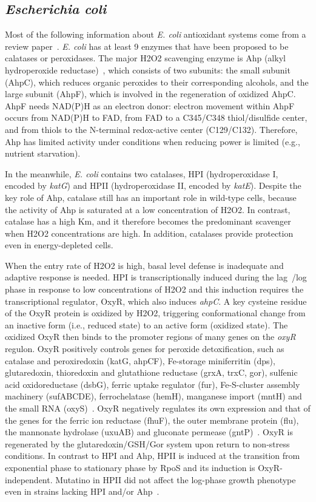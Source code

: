 \documentclass[11pt]{article}
\begin{document}
\subsection{\textit{Escherichia coli}}

Most of the following information about \textit{E. coli} antioxidant systems come from a review paper~\cite{mishra2012bacteria}. \textit{E. coli} has at least 9 enzymes that have been proposed to be calatases or peroxidases. The major H2O2 scavenging enzyme is Ahp (alkyl hydroperoxide reductase)~\cite{seaver2001alkyl}, which consists of two subunits: the small subunit (AhpC), which reduces organic peroxides to their corresponding alcohols, and the large subunit (AhpF), which is involved in the regeneration of oxidized AhpC. AhpF needs NAD(P)H as an electron donor: electron movement within AhpF occurs from NAD(P)H to FAD, from FAD to a C345/C348 thiol/disulfide center, and from thiols to the N-terminal redox-active center (C129/C132). Therefore, Ahp has limited activity under conditions when reducing power is limited (e.g., nutrient starvation).

In the meanwhile, \textit{E. coli} contains two catalases, HPI (hydroperoxidase I, encoded by \textit{katG}) and HPII (hydroperoxidase II, encoded by \textit{katE}). Despite the key role of Ahp, catalase still has an important role in wild-type cells, because the activity of Ahp is saturated at a low concentration of H2O2. In contrast, catalase has a high Km, and it therefore becomes the predominant scavenger when H2O2 concentrations are high. In addition, catalases provide protection even in energy-depleted cells.

When the entry rate of H2O2 is high, basal level defense is inadequate and adaptive response is needed. HPI is transcriptionally induced during the lag~\cite{madar2013promoter}/log phase in response to low concentrations of H2O2 and this induction requires the transcriptional regulator, OxyR, which also induces \textit{ahpC}. A key cysteine residue of the OxyR protein is oxidized by H2O2, triggering conformational change from an inactive form (i.e., reduced state) to an active form (oxidized state). The oxidized OxyR then binds to the promoter regions of many genes on the \textit{oxyR} regulon. OxyR positively controls genes for peroxide detoxification, such as catalase and peroxiredoxin (katG, ahpCF), Fe-storage miniferritin (dps), glutaredoxin, thioredoxin and glutathione reductase (grxA, trxC, gor), sulfenic acid oxidoreductase (dsbG), ferric uptake regulator (fur), Fe-S-cluster assembly machinery (sufABCDE), ferrochelatase (hemH), manganese import (mntH) and the small RNA (oxyS)~\cite{hillion2015thiol}. OxyR negatively regulates its own expression and that of the genes for the ferric ion reductase (fhuF), the outer membrane protein (flu), the mannonate hydrolase (uxuAB) and gluconate permease (gntP)~\cite{hillion2015thiol}. OxyR is regenerated by the glutaredoxin/GSH/Gor system upon return to non-stress conditions. In contrast to HPI and Ahp, HPII is induced at the transition from exponential phase to stationary phase by RpoS and its induction is OxyR-independent. Mutatino in HPII did not affect the log-phase growth phenotype even in strains lacking HPI and/or Ahp~\cite{seaver2001alkyl}.
\end{document}
